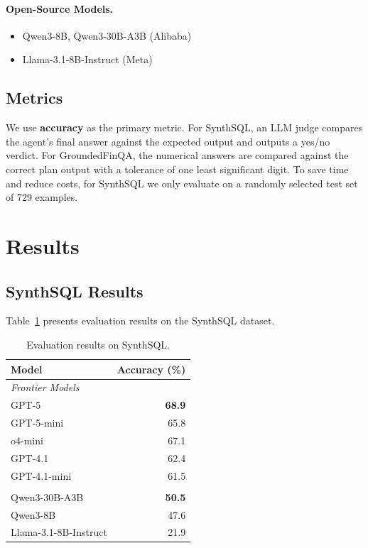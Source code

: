 \documentclass[11pt]{article}
\newcommand{\synthsubset}{SynthSQL\xspace}
\newcommand{\groundedfinqa}{GroundedFinQA\xspace}
\begin{document}
\paragraph{Open-Source Models.}
\begin{itemize}
    \item Qwen3-8B, Qwen3-30B-A3B (Alibaba)
    \item Llama-3.1-8B-Instruct (Meta)
\end{itemize}

\subsection{Metrics}

We use \textbf{accuracy} as the primary metric. For \synthsubset, an LLM judge compares the agent's final answer against the expected output and outputs a yes/no verdict. For \groundedfinqa, the numerical answers are compared against the correct plan output with a tolerance of one least significant digit. To save time and reduce costs, for \synthsubset we only evaluate on a randomly selected test set of 729 examples.

\section{Results}

\subsection{\synthsubset Results}

Table~\ref{tab:synthsql_results} presents evaluation results on the \synthsubset dataset.

\begin{table}[t]
\centering
\small
\setlength{\tabcolsep}{8pt}
\begin{tabular}{lr}
\toprule
\textbf{Model} & \textbf{Accuracy (\%)} \\
\midrule
\multicolumn{2}{l}{\textit{Frontier Models}} \\
GPT-5                  & \textbf{68.9} \\
GPT-5-mini             & 65.8 \\
o4-mini                & 67.1 \\
GPT-4.1                & 62.4 \\
GPT-4.1-mini           & 61.5 \\
\addlinespace
\multicolumn{2}{l}{\textit{Open-Source Models}} \\
Qwen3-30B-A3B          & \textbf{50.5} \\
Qwen3-8B               & 47.6 \\
Llama-3.1-8B-Instruct  & 21.9 \\
\bottomrule
\end{tabular}
\caption{Evaluation results on \synthsubset.}
\label{tab:synthsql_results}
\end{table}
\end{document}
